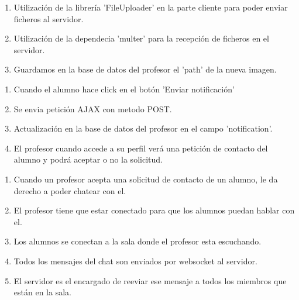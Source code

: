 \documentclass[notes,slidesec,a4]{seminar}
\begin{document}

\begin{hslide}
\begin{enumerate}
\item Utilización de la librería 'FileUploader' en la parte cliente para poder enviar ficheros al servidor.
\item Utilización de la dependecia 'multer' para la recepción de ficheros en el servidor.
\item Guardamos en la base de datos del profesor el 'path' de la nueva imagen.
\end{enumerate}
\end{hslide}


\begin{hslide}
\begin{enumerate}
\item Cuando el alumno hace click en el botón 'Enviar notificación'
\item Se envia petición AJAX con metodo POST.
\item Actualización en la base de datos del profesor en el campo 'notification'.
\item El profesor cuando accede a su perfil verá una petición de contacto del alumno y podrá aceptar o no la solicitud.
\end{enumerate}
\end{hslide}


\begin{hslide}
\begin{enumerate}
\item Cuando un profesor acepta una solicitud de contacto de un alumno, le da derecho a poder chatear con el.
\item El profesor tiene que estar conectado para que los alumnos puedan hablar con el.
\item Los alumnos se conectan a la sala donde el profesor esta escuchando.
\item Todos los mensajes del chat son enviados por websocket al servidor.
\item El servidor es el encargado de reeviar ese mensaje a todos los miembros que están en la sala.
\end{enumerate}
\end{hslide}
\end{document}

